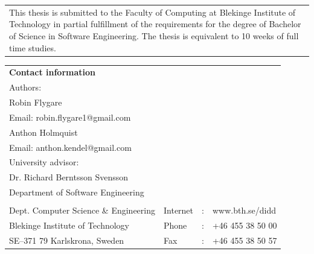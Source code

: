 \documentclass[a4paper,oneside]{bth}
\begin{document}
{\pagestyle{empty}
\changepage{5cm}{1cm}{-0.5cm}{-0.5cm}{}{-2cm}{}{}{}
\noindent
\begin{tabular}{p{\textwidth}}
{\small This thesis is submitted to the Faculty of Computing at Blekinge Institute of Technology in partial fulfillment of the requirements for the degree of Bachelor of Science in Software Engineering. The thesis is equivalent to 10 weeks of full time studies.}
\end{tabular}

\par\vspace {12cm}

\noindent%
\begin{tabular}{p{}lcl}
\textbf{Contact information}\\
Authors:\\
Robin Flygare\\
Email: robin.flygare1@gmail.com\\
Anthon Holmquist\\
Email: anthon.kendel@gmail.com\\

\par\vspace {4cm}
University advisor:\\
Dr. Richard Berntsson Svensson\\
Department of Software Engineering\\

\par\vspace {1cm}
\noindent%
 \\

Dept. Computer Science \& Engineering & Internet & : & www.bth.se/didd\\
Blekinge Institute of Technology & Phone	& : & +46 455 38 50 00 \\
SE--371 79 Karlskrona, Sweden & Fax & : & +46 455 38 50 57 \\

\end{tabular}
\clearpage
} %

\setcounter{page}{1}

\end{document}
